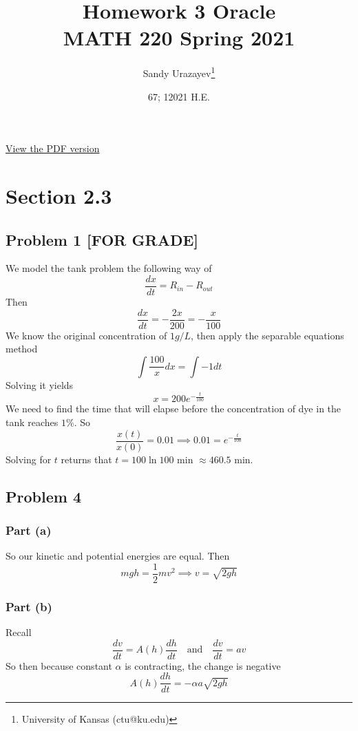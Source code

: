 \documentclass[12pt]{article}
\author{Sandy Urazayev\thanks{University of Kansas (ctu@ku.edu)}}
\date{67; 12021 H.E.}
\title{Homework 3 Oracle\\\medskip
\large MATH 220 Spring 2021}
\begin{document}
\maketitle
\href{./index.pdf}{View the PDF version​}

\section*{Section 2.3}
\label{sec:org30d5c92}
\subsection*{Problem 1 [FOR GRADE]}
\label{sec:org8ccfe48}
We model the tank problem the following way of
\begin{equation*}
  \frac{dx}{dt}=R_{in}-R_{out}
\end{equation*}
Then
\begin{equation*}
  \frac{dx}{dt}=-\frac{2x}{200}=-\frac{x}{100}
\end{equation*}
We know the original concentration of \(1g/L\), then apply the separable
equations method
\begin{equation*}
  \int \frac{100}{x} dx = \int -1 dt
\end{equation*}
Solving it yields
\begin{equation*}
x = 200 e^{-\frac{t}{100}}
\end{equation*}
We need to find the time that will elapse before the concentration of dye in
the tank reaches \(1\%\). So
\begin{equation*}
  \frac{x(t)}{x(0)} = 0.01 \implies 0.01 = e^{-\frac{t}{100}}
\end{equation*}
Solving for \(t\) returns that \(t = 100 \ln 100\) min \(\approx 460.5\) min. 
\subsection*{Problem 4}
\label{sec:orgd535dc6}
\subsubsection*{Part (a)}
\label{sec:org5c5fa9a}
So our kinetic and potential energies are equal. Then
\begin{equation*}
  mgh = \frac{1}{2}mv^2 \implies v = \sqrt{2gh}
\end{equation*}
\subsubsection*{Part (b)}
\label{sec:org29b5076}
Recall 
\begin{equation*}
  \frac{dv}{dt} = A(h) \frac{dh}{dt} \quad\text{and}\quad \frac{dv}{dt} = av
\end{equation*}
So then because constant \(\alpha\) is contracting, the change is negative
\begin{equation*}
  A(h)\frac{dh}{dt} = -\alpha a \sqrt{2gh}
\end{equation*}
\end{document}
